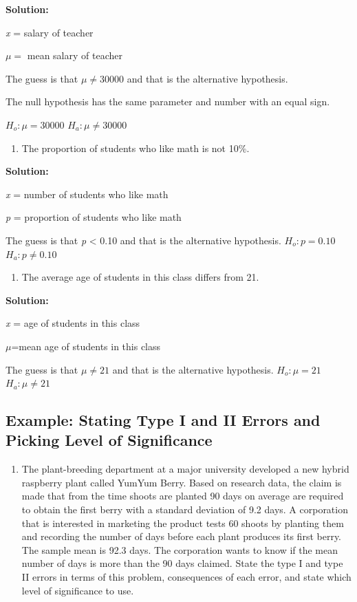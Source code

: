 \documentclass[]{book}
\providecommand{\tightlist}{%
  \setlength{\itemsep}{0pt}\setlength{\parskip}{0pt}}
\begin{document}
\textbf{Solution:}

\emph{x} = salary of teacher

\(\mu=\) mean salary of teacher

The guess is that \(\mu\ne30000\) and that is the alternative hypothesis.

The null hypothesis has the same parameter and number with an equal sign.

\(H_o:\mu=30000\)
\(H_a:\mu\ne30000\)

\begin{enumerate}
\def\labelenumi{\alph{enumi}.}
\setcounter{enumi}{1}
\tightlist
\item
  The proportion of students who like math is not 10\%.
\end{enumerate}

\textbf{Solution:}

\emph{x} = number of students who like math

\emph{p} = proportion of students who like math

The guess is that \emph{p} \textless{} 0.10 and that is the alternative hypothesis.
\(H_o:p=0.10\)
\(H_a:p\ne0.10\)

\begin{enumerate}
\def\labelenumi{\alph{enumi}.}
\setcounter{enumi}{2}
\tightlist
\item
  The average age of students in this class differs from 21.
\end{enumerate}

\textbf{Solution:}

\emph{x} = age of students in this class

\(\mu\)=mean age of students in this class

The guess is that \(\mu\ne21\) and that is the alternative hypothesis.
\(H_o:\mu=21\)
\(H_a:\mu\ne21\)

\hypertarget{example-stating-type-i-and-ii-errors-and-picking-level-of-significance}{%
\subsection{Example: Stating Type I and II Errors and Picking Level of Significance}\label{example-stating-type-i-and-ii-errors-and-picking-level-of-significance}}

\begin{enumerate}
\def\labelenumi{\alph{enumi}.}
\tightlist
\item
  The plant-breeding department at a major university developed a new hybrid raspberry plant called YumYum Berry. Based on research data, the claim is made that from the time shoots are planted 90 days on average are required to obtain the first berry with a standard deviation of 9.2 days. A corporation that is interested in marketing the product tests 60 shoots by planting them and recording the number of days before each plant produces its first berry. The sample mean is 92.3 days. The corporation wants to know if the mean number of days is more than the 90 days claimed. State the type I and type II errors in terms of this problem, consequences of each error, and state which level of significance to use.
\end{enumerate}
\end{document}
